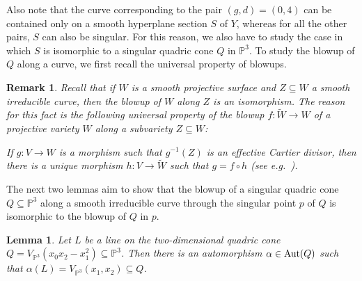 \documentclass[english,11pt,reqno]{amsart}
\newcommand{\sub}{\subseteq}
\newcommand{\Pthree}{\mathbb{P}^3}
\newcommand{\VPthree}{V_{\Pthree}}
\newcommand{\Aut}{\textup{Aut}}
\newtheorem{rmk}[thm]{Remark}
\newtheorem{lem}[thm]{Lemma}
\begin{document}
Also note that the curve corresponding to the pair $(g,d)=(0,4)$ can be contained only on a smooth hyperplane section $S$ of $Y$, whereas for all the other pairs, $S$ can also be singular. For this reason, we also have to study the case in which $S$ is isomorphic to a singular quadric cone $Q$ in $\Pthree$. To study the blowup of $Q$ along a curve, we first recall the universal property of blowups.
%
\begin{rmk} \label{rmk:universal_property_of_blowups}
Recall that if $W$ is a smooth projective surface and $Z\sub W$ a smooth irreducible curve, then the blowup of $W$ along $Z$ is an isomorphism. The reason for this fact is the following universal property of the blowup $f:\widetilde{W} \rightarrow W$ of a projective variety $W$ along a subvariety $Z\sub W$: \par 
If $g:V\rightarrow W$ is a morphism such that $g^{-1}(Z)$ is an effective Cartier divisor, then there is a unique morphism $h:V \rightarrow \widetilde{W}$ such that $g=f\circ h$ (see e.g.\ \cite[Prop.\ II.7.14]{Hartshorne}). 
\end{rmk}
%
The next two lemmas aim to show that the blowup of a singular quadric cone $Q\sub \Pthree$ along a smooth irreducible curve through the singular point $p$ of $Q$ is isomorphic to the blowup of $Q$ in $p$.
%
%
\begin{lem} \label{lem:automorphisms_quadric_cone}
Let $L$ be a line on the two-dimensional quadric cone $Q=\VPthree(x_0x_2-x_1^2)\sub \Pthree$. Then there is an automorphism $\alpha \in \Aut(Q)$ such that $\alpha(L)=\VPthree(x_1,x_2)\sub Q$. 
\end{lem}
%
\end{document}
